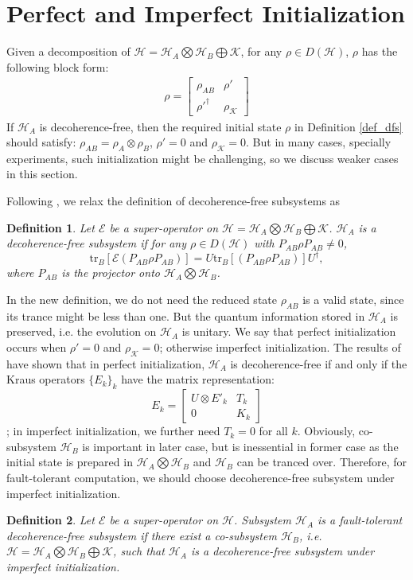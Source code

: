 \documentclass[journal]{IEEEtran}
\def\h{\ensuremath{\mathcal{H}}}
\def\k{\ensuremath{\mathcal{K}}}
\def\e{\ensuremath{\mathcal{E}}}
\def\k{\mathcal{K}}
\newtheorem{definition}{Definition}
\begin{document}
\section{Perfect and Imperfect Initialization}
 Given a decomposition of $\h=\h_A\bigotimes \h_B\bigoplus\k$, for any $\rho\in D(\h)$, $\rho$ has the following block form:
  \begin{eqnarray}
  \rho=\left[ \begin{matrix}
  \rho_{AB}&\rho'\\
  \rho'^\dagger&\rho_\k
  \end{matrix}\right]
\end{eqnarray}
If $\h_A$ is decoherence-free, then the required initial state $\rho$ in Definition \ref{def_dfs} should satisfy: $\rho_{AB}=\rho_A\otimes \rho_B$, $\rho'=0$ and $\rho_\k=0$. 
  But in many cases, specially experiments,  such initialization might be challenging, so we discuss weaker cases in this section.

 Following \cite{shabani2005theory}, we relax the definition of decoherence-free subsystems as
 \begin{definition}
   Let $\e$ be a super-operator on $\h=\h_A\bigotimes\h_B\bigoplus\k $.
   $\h_A$ is a decoherence-free subsystem if for any $\rho\in D(\h)$ with $P_{AB}\rho P_{AB}\not =0$, $$\textrm{tr}_{B}[\e(P_{AB}\rho P_{AB})]=U\textrm{tr}_{B}[(P_{AB}\rho P_{AB})]U^\dagger,$$
   where $P_{AB}$ is the projector onto $\h_A\bigotimes \h_B$.
 \end{definition}

In the new definition, we do not need the reduced state $\rho_{AB}$ is a valid state, since its trance might be less than one. But the quantum  information stored in $\h_A$ is preserved, i.e. the evolution on $\h_A$ is unitary. We say that perfect initialization occurs when $\rho'=0$ and $\rho_{\k}=0$; otherwise imperfect initialization. The results of \cite{shabani2005theory} have shown that in perfect initialization, $\h_A$ is decoherence-free if and only if the Kraus operators $\{E_k\}_k$ have the matrix representation:
$$E_{k}=\left [\begin{matrix}
  U\otimes E'_{k}&T_k\\
  0&K_k
\end{matrix}\right]$$
; in imperfect initialization, we further need  $T_{k}=0$ for all $k$.
Obviously, co-subsystem $\h_B$ is important in later case, but is inessential in former case as the initial state is prepared in $\h_A\bigotimes \h_B$ and $\h_B$ can be tranced over. Therefore, for fault-tolerant computation, we should choose decoherence-free subsystem under imperfect initialization.  
\begin{definition}\label{Def_new_dfs}
  Let $\e$ be a super-operator on $\h$.  Subsystem $\h_A$  is a fault-tolerant decoherence-free subsystem if there exist a co-subsystem $\h_B$, i.e. $\h=\h_A\bigotimes \h_B\bigoplus\k$, such that $\h_A$ is a decoherence-free subsystem under imperfect initialization.
\end{definition}
\end{document}
